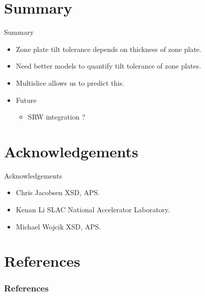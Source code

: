 \documentclass{beamer}
\begin{document}
\section*{Summary}

\begin{frame}{Summary}
  \begin{itemize}
  \item
  	Zone plate tilt tolerance depends on thickness of zone plate.
  \item
    Need better models to quantify tilt tolerance of zone plates.
  \item
    Multislice allows us to predict this.
  \end{itemize}  
  \begin{itemize}
  \item
    Future
    \begin{itemize}
    \item
	SRW integration ?
    \end{itemize}
  \end{itemize}
\end{frame}

\section*{Acknowledgements}

\begin{frame}{Acknowledgements}
\begin{itemize}
	\item
	\alert{Chris Jacobsen} XSD, APS.
	\item
	\alert{Kenan Li} SLAC National Accelerator Laboratory.
	\item
	\alert{Michael Wojcik} XSD, APS.
		
\end{itemize}
\end{frame}


\renewcommand*{\bibfont}{\small}
\section{References}
\begin{frame}[t, allowframebreaks]
\frametitle{References}


\end{frame}
\end{document}
